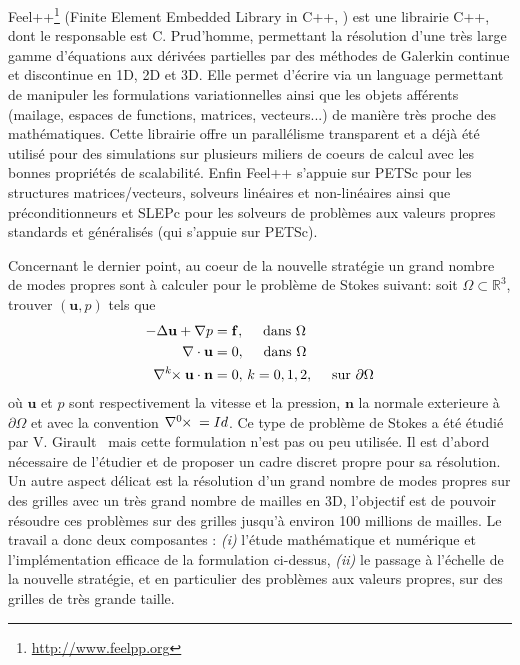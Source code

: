 \documentclass[12pt]{article} \usepackage{fontspec}
\newcommand{\curlk}[1][k]{\ensuremath{\nabla^{#1}\hspace{-.3em}\times}\xspace}
\begin{document}
Feel++\footnote{\url{http://www.feelpp.org}} (Finite Element Embedded Library in C++,
\cite{PRUDHOMME:2012:HAL-00662868:3,feelpp098:10046} ) est une librairie C++,
dont le responsable est C. Prud'homme, permettant la résolution d'une très large
gamme d'équations aux dérivées partielles par des méthodes de Galerkin continue
et discontinue en 1D, 2D et 3D. Elle permet d'écrire via un language permettant
de manipuler les formulations variationnelles ainsi que les objets afférents
(mailage, espaces de functions, matrices, vecteurs...) de manière très proche
des mathématiques. Cette librairie offre un parallélisme transparent et a déjà
été utilisé pour des simulations sur plusieurs miliers de coeurs de calcul avec
les bonnes propriétés de scalabilité. Enfin Feel++ s'appuie sur PETSc pour les
structures matrices/vecteurs, solveurs linéaires et non-linéaires ainsi que
préconditionneurs et SLEPc pour les solveurs de problèmes aux valeurs propres
standards et généralisés (qui s'appuie sur PETSc).

Concernant le dernier point, au coeur de la nouvelle stratégie un grand nombre
de modes propres sont à calculer pour le problème de Stokes suivant: soit
$\Omega \subset \mathbb{R}^3$, trouver $(\mathbf{u},p)$ tels que
\begin{align}
  \label{eq:1}
  -\Delta \mathbf{u} + \nabla p &= \mathbf{f},\quad \mbox{ dans } \Omega\\
  \nabla \cdot \mathbf{u} &= 0,\quad \mbox{ dans } \Omega\\
  \curlk{} \mathbf{u} \cdot \mathbf{n} &= 0,\, k=0,1,2,\quad \mbox{ sur
  } \partial \Omega
\end{align}
où $\mathbf{u}$ et $p$ sont respectivement la vitesse et la pression,
$\mathbf{n}$ la normale exterieure à $\partial \Omega$ et avec la convention
$\curlk[0]{} = Id$. Ce type de problème de Stokes a été étudié par
V. Girault~\cite{girault90-1} mais cette formulation n'est pas ou peu
utilisée. Il est d'abord nécessaire de l'étudier et de proposer un cadre discret
propre pour sa résolution. Un autre aspect délicat est la résolution d'un grand
nombre de modes propres sur des grilles avec un très grand nombre de mailles en
3D, l'objectif est de pouvoir résoudre ces problèmes sur des grilles jusqu'à
environ 100 millions de mailles.  Le travail a donc deux composantes :
\textit{(i)} l'étude mathématique et numérique et l'implémentation efficace de
la formulation ci-dessus, \textit{(ii)} le passage à l'échelle de la nouvelle
stratégie, et en particulier des problèmes aux valeurs propres, sur des grilles
de très grande taille.
\end{document}
